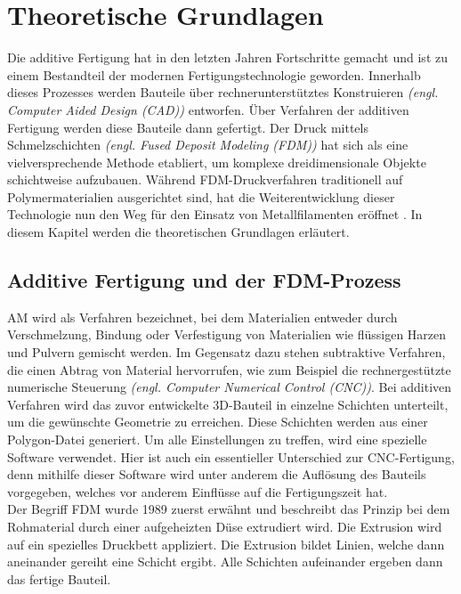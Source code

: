 \chapter{Theoretische Grundlagen}

Die additive Fertigung hat in den letzten Jahren Fortschritte gemacht und ist zu einem Bestandteil der modernen Fertigungstechnologie geworden. Innerhalb dieses Prozesses werden Bauteile über rechnerunterstütztes Konstruieren \textit{(engl. Computer Aided Design (CAD))} entworfen. Über Verfahren der additiven Fertigung werden diese Bauteile dann gefertigt. Der Druck mittels Schmelzschichten \textit{(engl. Fused Deposit Modeling (FDM))} hat sich als eine vielversprechende Methode etabliert, um komplexe dreidimensionale Objekte schichtweise aufzubauen. Während FDM-Druckverfahren traditionell auf Polymermaterialien ausgerichtet sind, hat die Weiterentwicklung dieser Technologie nun den Weg für den Einsatz von Metallfilamenten eröffnet \autocite{Osama2019}. In diesem Kapitel werden die theoretischen Grundlagen erläutert.

\section{Additive Fertigung und der FDM-Prozess}

AM wird als Verfahren bezeichnet, bei dem Materialien entweder durch Verschmelzung, Bindung oder Verfestigung von Materialien wie flüssigen Harzen und Pulvern gemischt werden. Im Gegensatz dazu stehen subtraktive Verfahren, die einen Abtrag von Material hervorrufen, wie zum Beispiel die rechnergestützte numerische Steuerung \textit{(engl. Computer Numerical Control (CNC))}. Bei additiven Verfahren wird das zuvor entwickelte 3D-Bauteil in einzelne Schichten unterteilt, um die gewünschte Geometrie zu erreichen. Diese Schichten werden aus einer Polygon-Datei generiert. Um alle Einstellungen zu treffen, wird eine spezielle Software verwendet. Hier ist auch ein essentieller Unterschied zur CNC-Fertigung, denn mithilfe dieser Software wird unter anderem die Auflösung des Bauteils vorgegeben, welches vor anderem Einflüsse auf die Fertigungszeit hat.\\
Der Begriff FDM wurde 1989 zuerst erwähnt und beschreibt das Prinzip bei dem Rohmaterial durch einer aufgeheizten Düse extrudiert wird. Die Extrusion wird auf ein spezielles Druckbett appliziert. Die Extrusion bildet Linien, welche dann aneinander gereiht eine Schicht ergibt. Alle Schichten aufeinander ergeben dann das fertige Bauteil. \autocite{Osama2019}


